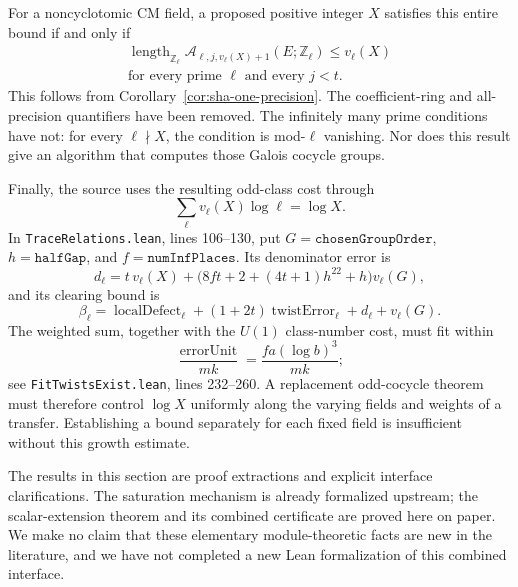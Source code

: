 For a noncyclotomic CM field, a proposed positive integer \(X\)
satisfies this entire bound if and only if
\[
 \boxed{\begin{gathered}
 \operatorname{length}_{\mathbb Z_\ell}
    \mathcal A_{\ell,j,v_\ell(X)+1}(E;\mathbb Z_\ell)
       \leq v_\ell(X)\\
 \text{for every prime }\ell\text{ and every }j<t.
 \end{gathered}}
\]
This follows from Corollary~\ref{cor:sha-one-precision}. The
coefficient-ring and all-precision quantifiers have been removed.
The infinitely many prime conditions have not: for every
\(\ell\nmid X\), the condition is mod-\(\ell\) vanishing.
Nor does this result give an algorithm that computes those Galois
cocycle groups.

Finally, the source uses the resulting odd-class cost through
\[
 \sum_\ell v_\ell(X)\log\ell=\log X.
\]
In \texttt{TraceRelations.lean}, lines 106--130, put
\(G=\texttt{chosenGroupOrder}\), \(h=\texttt{halfGap}\), and
\(f=\texttt{numInfPlaces}\). Its denominator error is
\[
 d_\ell=t\,v_\ell(X)
 +\bigl(8ft+2+(4t+1)h^{22}+h\bigr)v_\ell(G),
\]
and its clearing bound is
\[
 \beta_\ell=
   \operatorname{localDefect}_\ell
   +(1+2t)\operatorname{twistError}_\ell+d_\ell+v_\ell(G).
\]
The weighted sum, together with the \(U(1)\) class-number cost,
must fit within
\[
 \frac{\operatorname{errorUnit}}{mk}
   =\frac{fa(\log b)^3}{mk};
\]
see \texttt{FitTwistsExist.lean}, lines 232--260.
A replacement odd-cocycle theorem must therefore control \(\log X\)
uniformly along the varying fields and weights of a transfer.
Establishing a bound separately for each fixed field is insufficient
without this growth estimate.

The results in this section are proof extractions and explicit
interface clarifications. The saturation mechanism is already
formalized upstream; the scalar-extension theorem and its combined
certificate are proved here on paper. We make no claim that these
elementary module-theoretic facts are new in the literature, and we
have not completed a new Lean formalization of this combined interface.

